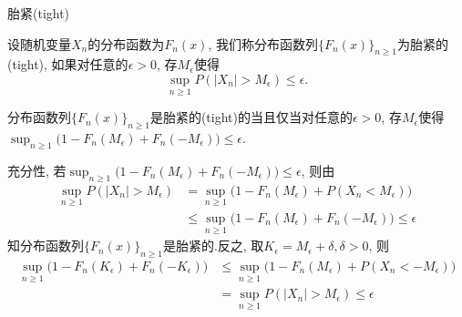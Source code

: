 \documentclass[Prob-All.tex]{subfiles}
\begin{document}
\begin{frame}{胎紧(tight)}
	\vspace{-0.1cm}

	\begin{defi}设随机变量$X_n$的分布函数为$F_n(x)$, 我们称分布函数列$\{F_n(x)\}_{n\geq 1}$为胎紧的(tight), 如果对任意的$\epsilon>0$, 存$M_{\epsilon}$使得
	  \[\sup_{n\geq 1}P(|X_n|>M_{\epsilon})\leq\epsilon.\]
	\end{defi}
	\pause%
	\begin{thm}
		分布函数列$\{F_n(x)\}_{n\geq 1}$是胎紧的(tight)的当且仅当对任意的$\epsilon>0$, 存$M_{\epsilon}$使得$\sup_{n\geq 1} \big(1-F_{n}\left(M_{\epsilon}\right)+F_{n}\left(-M_{\epsilon}\right) \big)\leq \epsilon$.
	\end{thm}

	\zheng 充分性, 若$\sup_{n\geq 1} \big(1-F_{n}\left(M_{\epsilon}\right)+F_{n}\left(-M_{\epsilon}\right) \big)\leq \epsilon$, 则由
	{\small \begin{align*}
		\sup_{n\geq 1}P(|X_n|>M_{\epsilon})&=\sup_{n\geq 1}\big(1-F_n(M_{\epsilon})+P(X_n<M_{\epsilon})\big)\\
		&\leq \sup_{n\geq 1}\big(1-F_{n}\left(M_{\epsilon}\right)+F_{n}\left(-M_{\epsilon}\right)\big)\leq \epsilon
	\end{align*}}
	知分布函数列$\{F_n(x)\}_{n\geq 1}$是胎紧的.\pause  反之, 取$K_\epsilon=M_\epsilon+\delta, \delta>0$, 则
	{\small \begin{align*}
		\sup_{n\geq 1}\big(1-F_{n}\left(K_{\epsilon}\right)+F_{n}\left(-K_{\epsilon}\right)\big)&\leq \sup_{n\geq 1}\big(1-F_{n}\left(M_{\epsilon}\right)+P(X_n<-M_\epsilon)\big)\\
		&=\sup_{n\geq 1}P(|X_n|>M_{\epsilon})\leq  \epsilon
	\end{align*}}


	\end{frame}
\end{document}
